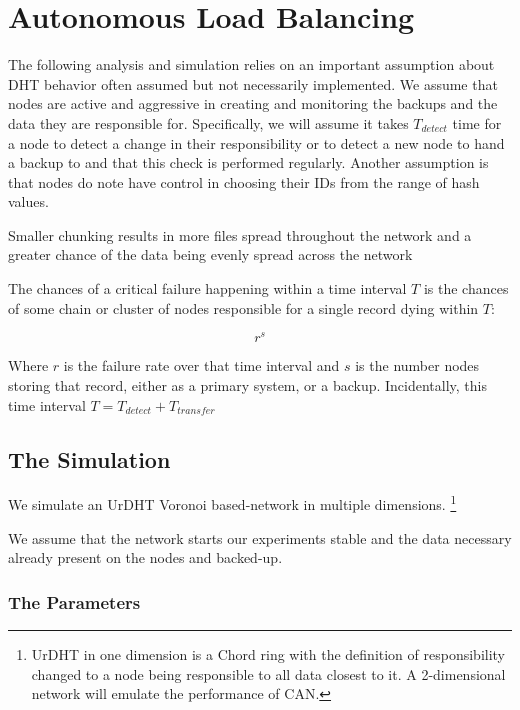 \chapter{Autonomous Load Balancing}
\label{chapter:auto-balance}





The following analysis and simulation relies on an important assumption about DHT behavior often assumed but not necessarily implemented.
We assume that nodes are active and aggressive in creating and monitoring the backups and the data they are responsible for.
Specifically, we will assume  it takes  $T_{detect}$ time for a node to detect a change in their responsibility or to detect a new node to hand a backup to and that this check is performed regularly.
Another assumption is that nodes do note have control in choosing their IDs from the range of hash values.

Smaller chunking results in more files spread throughout the  network and a greater chance of the data being evenly spread across the network 

The chances of a critical failure happening within a time interval $ T $ is the chances of some chain or cluster of nodes responsible for a single record dying within $ T $:

$$r^{s}$$

Where $ r $ is the failure rate over that time interval and $s$ is the number nodes storing that record, either as a primary system, or a backup.
Incidentally, this time interval $T = T_{detect} + T_{transfer} $


\section{The Simulation}

We simulate an UrDHT Voronoi based-network in multiple dimensions. \footnote{UrDHT in one dimension is a Chord ring with the definition of responsibility changed to a node being responsible to all data closest to it. A 2-dimensional network will emulate the performance of CAN.}

We assume that the network starts our experiments stable and the data necessary already present on the nodes and backed-up.

\subsection{The Parameters}

